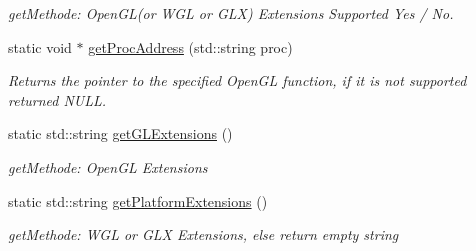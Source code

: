 \begin{DoxyCompactItemize}
\begin{DoxyCompactList}\small\item\em getMethode: OpenGL(or WGL or GLX) Extensions Supported Yes / No. \item\end{DoxyCompactList}\item 
static void $\ast$ \hyperlink{class_f2_c_1_1_shader_g_l_aa8b528886b357ab98089f0307aeb1e6c}{getProcAddress} (std::string proc)
\begin{DoxyCompactList}\small\item\em Returns the pointer to the specified OpenGL function, if it is not supported returned NULL. \item\end{DoxyCompactList}\item 
\hypertarget{class_f2_c_1_1_shader_g_l_a70387912b59c00f9e8292564106f872c}{
static std::string \hyperlink{class_f2_c_1_1_shader_g_l_a70387912b59c00f9e8292564106f872c}{getGLExtensions} ()}
\label{class_f2_c_1_1_shader_g_l_a70387912b59c00f9e8292564106f872c}

\begin{DoxyCompactList}\small\item\em getMethode: OpenGL Extensions \item\end{DoxyCompactList}\item 
\hypertarget{class_f2_c_1_1_shader_g_l_a660433d56dee5f022f1a6a02aae167ce}{
static std::string \hyperlink{class_f2_c_1_1_shader_g_l_a660433d56dee5f022f1a6a02aae167ce}{getPlatformExtensions} ()}
\label{class_f2_c_1_1_shader_g_l_a660433d56dee5f022f1a6a02aae167ce}

\begin{DoxyCompactList}\small\item\em getMethode: WGL or GLX Extensions, else return empty string \item\end{DoxyCompactList}\end{DoxyCompactItemize}
